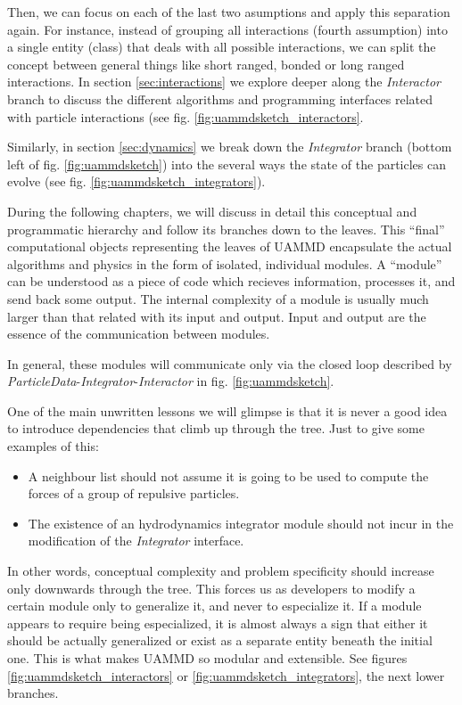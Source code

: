 \documentclass[ twoside,openright,titlepage,numbers=noenddot,%
headinclude,footinclude,cleardoublepage=empty,abstract=on,
BCOR=5mm,paper=a4,fontsize=11pt, dvipsnames
]{scrreprt}
\newcommand{\uammd}{\gls{UAMMD}\xspace}
\begin{document}
Then, we can focus on each of the last two asumptions and apply this separation again. For instance, instead of grouping all interactions (fourth assumption) into a single entity (class) that deals with all possible interactions, we can split the concept between general things like short ranged, bonded or long ranged interactions. In section \ref{sec:interactions} we explore deeper along the \emph{Interactor} branch to discuss the different algorithms and programming interfaces related with particle interactions (see fig. \ref{fig:uammdsketch_interactors}.

Similarly, in section \ref{sec:dynamics} we break down the \emph{Integrator} branch (bottom left of fig. \ref{fig:uammdsketch}) into the several ways the state of the particles can evolve (see fig. \ref{fig:uammdsketch_integrators}).

During the following chapters, we will discuss in detail this conceptual and programmatic hierarchy and follow its branches down to the leaves. This ``final'' computational objects representing the leaves of \uammd encapsulate the actual algorithms and physics in the form of isolated, individual modules. A ``module'' can be understood as a piece of code which recieves information, processes it, and send back some output. The internal complexity of a module is usually much larger than that related with its input and output. Input and output are the essence of the communication between modules.

In general, these modules will communicate only via the closed loop described by \emph{ParticleData}-\emph{Integrator}-\emph{Interactor} in fig. \ref{fig:uammdsketch}.

One of the main unwritten lessons we will glimpse is that it is never a good idea to introduce dependencies that climb up through the tree. Just to give some examples of this:
\begin{itemize}
\item A neighbour list should not assume it is going to be used to
  compute the forces of a group of repulsive particles.
\item The existence
  of an hydrodynamics integrator module should not incur in the
  modification of the \emph{Integrator} interface.
\end{itemize}
In other words, conceptual complexity and problem specificity should increase only downwards through the tree. This forces us as developers to modify a certain module only to generalize it, and never to especialize it. If a module appears to require being especialized, it is almost always a sign that either it should be actually generalized or exist as a separate entity beneath the initial one. This is what makes \uammd so modular and extensible. See figures \ref{fig:uammdsketch_interactors} or \ref{fig:uammdsketch_integrators}, the next lower branches.
\end{document}
